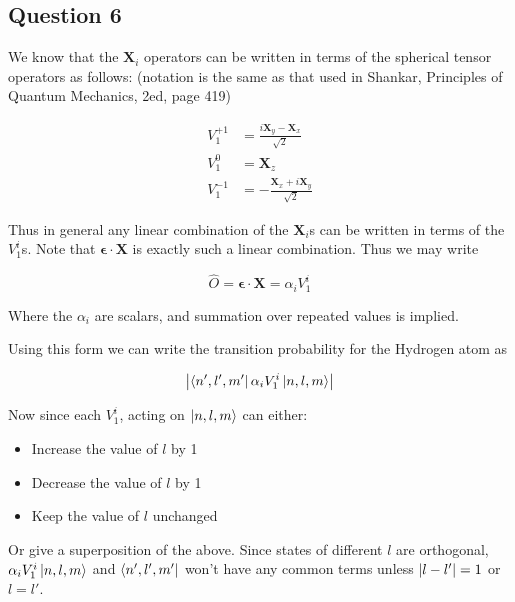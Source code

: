 

\subsection*{Question 6}

We know that the $\mathbf{X}_i$ operators can be written in terms of the spherical tensor operators as follows: (notation is the same as that used in Shankar, Principles of Quantum Mechanics, 2ed, page 419)

\begin{equation}
    \begin{split}
        V^{+1}_1 &= \frac{i \mathbf{X}_y - \mathbf{X}_x}{\sqrt{2}} \\
        V^0_1 &= \mathbf{X}_z \\
        V^{-1}_1 &= -\frac{\mathbf{X}_x + i \mathbf{X}_y}{\sqrt{2}} 
    \end{split}
\end{equation}

Thus in general any linear combination of the $\mathbf{X}_i$s can be written in terms of the $V^i_1$s. Note that $\mathbf{\epsilon} \cdot \mathbf{X}$ is exactly such a linear combination. Thus we may write 

\begin{equation}
    \hat{O} = \mathbf{\epsilon} \cdot \mathbf{X} = \alpha_i V^i_1
\end{equation}
    
Where the $\alpha_i$ are scalars, and summation over repeated values is implied. 

Using this form we can write the transition probability for the Hydrogen atom as

\begin{equation}
    \abs{\bra{n',l',m'} \alpha_i V^i_1 \ket{n,l,m}}
\end{equation}

Now since each $V^i_1$, acting on $ \ket{n,l,m}$ can either:
\begin{itemize}
    \item Increase the value of $l$ by 1
    \item Decrease the value of $l$ by 1
    \item Keep the value of $l$ unchanged
\end{itemize}

Or give a superposition of the above. Since states of different $l$ are orthogonal, $\alpha_i V^i_1 \ket{n,l,m}$ and $\bra{n',l',m'}$ won't have any common terms unless $\abs{l - l'} = 1$ or $l = l'$. 

